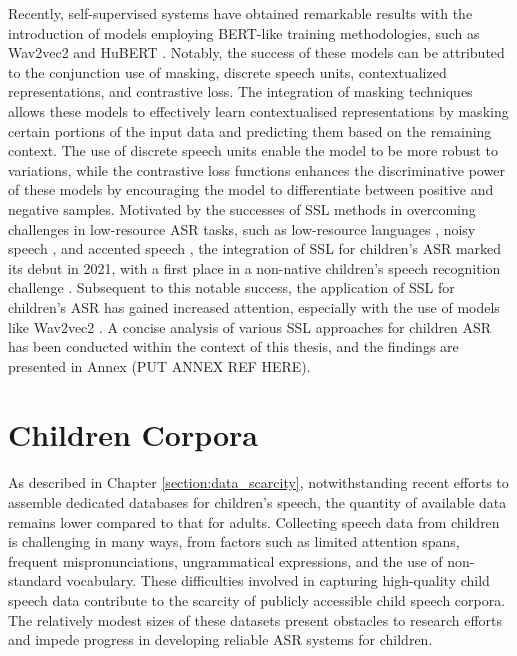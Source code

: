 Recently, self-supervised systems have obtained remarkable results with the introduction of models employing BERT-like training methodologies, such as Wav2vec2 \cite{baevski2020wav2vec} and HuBERT \cite{hsu2021hubert}. Notably, the success of these models can be attributed to the conjunction use of masking, discrete speech units, contextualized representations, and contrastive loss. The integration of masking techniques allows these models to effectively learn contextualised representations by masking certain portions of the input data and predicting them based on the remaining context. The use of discrete speech units enable the model to be more robust to variations, while the contrastive loss functions enhances the discriminative power of these models by encouraging the model to differentiate between positive and negative samples.
Motivated by the successes of SSL methods in overcoming challenges in low-resource ASR tasks, such as low-resource languages \cite{riviere2020unsupervised}, noisy speech \cite{wang2022wav2vec}, and accented speech \cite{li2021accent}, the integration of SSL for children's ASR marked its debut in 2021, with a first place in a non-native children's speech recognition challenge \cite{xu2021tal}. Subsequent to this notable success, the application of SSL for children's ASR has gained increased attention, especially with the use of models like Wav2vec2 \cite{jain2023wav2vec2,jain2023adaptation,fan2022draft}. A concise analysis of various SSL approaches for children ASR has been conducted within the context of this thesis, and the findings are presented in Annex (PUT ANNEX REF HERE).
\section{Children Corpora}
\label{section:children_corpora}
As described in Chapter \ref{section:data_scarcity}, notwithstanding recent efforts to assemble dedicated databases for children's speech, the quantity of available data remains lower compared to that for adults. Collecting speech data from children  is challenging in many ways, from factors such as limited attention spans, frequent mispronunciations, ungrammatical expressions, and the use of non-standard vocabulary. These difficulties involved in capturing high-quality child speech data contribute to the scarcity of publicly accessible child speech corpora. The relatively modest sizes of these datasets present obstacles to research efforts and impede progress in developing reliable ASR systems for children.


